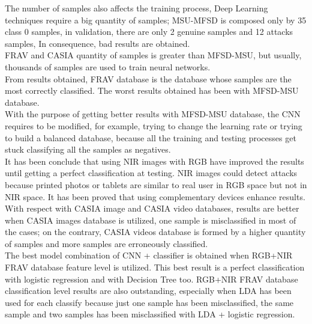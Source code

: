 The number of samples also affects the training process, Deep Learning techniques require a big quantity of samples; MSU-MFSD is composed only by 35 class 0 samples, in validation, there are only 2 genuine samples and 12 attacks samples, In consequence, bad results are obtained.\\

FRAV and CASIA quantity of samples is greater than MFSD-MSU, but usually, thousands of samples are used to train neural networks.\\ 
 
From results obtained, FRAV database is the database whose samples are the most correctly classified. The worst results obtained has been with MFSD-MSU database.\\

With the purpose of getting better results with MFSD-MSU database, the CNN requires to be modified, for example, trying to change the learning rate or trying to build a balanced database, because all the training and testing processes get stuck classifying all the samples as negatives.\\

It has been conclude that using NIR images with RGB have improved the results until getting a perfect classification at testing. NIR images could detect attacks because printed photos or tablets are similar to real user in RGB space but not in NIR space. It has been proved that using complementary devices enhance results.\\

With respect with CASIA image and CASIA video databases, results are  better when CASIA images database is utilized, one sample is misclassified in most of the cases; on the contrary, CASIA videos database is formed by a higher quantity of samples and more samples are erroneously classified.\\

The best model combination of CNN + classifier is obtained when RGB+NIR FRAV database feature level is utilized. This best result is a perfect classification with logistic regression and with Decision Tree too. RGB+NIR FRAV database classification level results are also outstanding, especially when LDA has been used for each classify because just one sample has been misclassified, the same sample and two samples has been misclassified with LDA + logistic regression.\\


